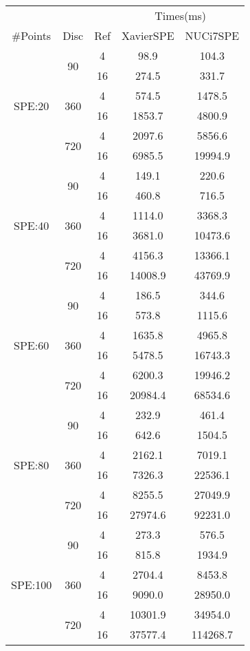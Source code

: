 \begin{center}
\begin{tabular}{c|c|c|c|c}
	&&&\multicolumn{2}{c}{Times(ms)}\\
	\#Points&Disc&Ref&XavierSPE&NUCi7SPE\\
\hline
	\multirow{6}{*}{SPE:20}&\multirow{2}{*}{90}&4&98.9&104.3\\
			&&16&274.5&331.7\\
		&\multirow{2}{*}{360}&4&574.5&1478.5\\
			&&16&1853.7&4800.9\\
		&\multirow{2}{*}{720}&4&2097.6&5856.6\\
			&&16&6985.5&19994.9\\

\hline
	\multirow{6}{*}{SPE:40}&\multirow{2}{*}{90}&4&149.1&220.6\\
			&&16&460.8&716.5\\
		&\multirow{2}{*}{360}&4&1114.0&3368.3\\
			&&16&3681.0&10473.6\\
		&\multirow{2}{*}{720}&4&4156.3&13366.1\\
			&&16&14008.9&43769.9\\

\hline
	\multirow{6}{*}{SPE:60}&\multirow{2}{*}{90}&4&186.5&344.6\\
			&&16&573.8&1115.6\\
		&\multirow{2}{*}{360}&4&1635.8&4965.8\\
			&&16&5478.5&16743.3\\
		&\multirow{2}{*}{720}&4&6200.3&19946.2\\
			&&16&20984.4&68534.6\\

\hline
	\multirow{6}{*}{SPE:80}&\multirow{2}{*}{90}&4&232.9&461.4\\
			&&16&642.6&1504.5\\
		&\multirow{2}{*}{360}&4&2162.1&7019.1\\
			&&16&7326.3&22536.1\\
		&\multirow{2}{*}{720}&4&8255.5&27049.9\\
			&&16&27974.6&92231.0\\

\hline
	\multirow{6}{*}{SPE:100}&\multirow{2}{*}{90}&4&273.3&576.5\\
			&&16&815.8&1934.9\\
		&\multirow{2}{*}{360}&4&2704.4&8453.8\\
			&&16&9090.0&28950.0\\
		&\multirow{2}{*}{720}&4&10301.9&34954.0\\
			&&16&37577.4&114268.7\\

\hline
\end{tabular}
\end{center}

